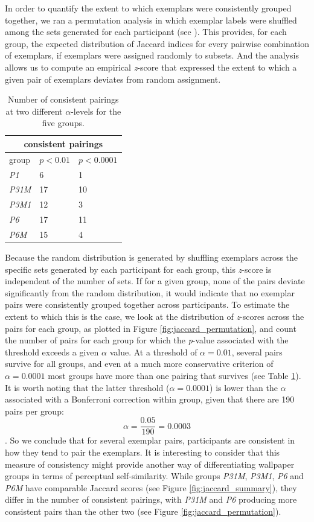 \documentclass[11pt, twoside]{article}
\begin{document}
In order to quantify the extent to which exemplars were consistently grouped together, we ran a permutation analysis in which exemplar labels were shuffled among the sets generated for each participant (see ). This provides, for each group, the expected distribution of Jaccard indices for every pairwise combination of exemplars, if exemplars were assigned randomly to subsets. And the analysis allows us to compute an empirical \textit{z}-score that expressed the extent to which a given pair of exemplars deviates from random assignment. 
\begin{table}
	\centering
	\begin{tabular}[t]{ |p{2cm}||p{2cm}|p{2cm}| }
		\hline
		\multicolumn{3}{|c|}{consistent pairings} \\
		\hline
		group & $p<0.01$ & $p<0.0001$ \\
		\hline
		\textit{P1}   & 6  & 1  \\
		\textit{P31M} & 17 & 10 \\
		\textit{P3M1} & 12 & 3  \\
		\textit{P6}   & 17 & 11 \\
		\textit{P6M}  & 15 & 4  \\
		\hline
	\end{tabular}
	\caption{Number of consistent pairings at two different $\alpha$-levels for the five groups.  }
	\label{table:pairings}
\end{table}
Because the random distribution is generated by shuffling exemplars across the specific sets generated by each participant for each group, this \textit{z}-score is independent of the number of sets. If for a given group, none of the pairs deviate significantly from the random distribution, it would indicate that no exemplar pairs were consistently grouped together across participants. To estimate the extent to which this is the case, we look at the distribution of \textit{z}-scores across the pairs for each group, as plotted in Figure \ref{fig:jaccard_permutation}, and count the number of pairs for each group for which the \textit{p}-value associated with the threshold exceeds a given $\alpha$ value. At a threshold of $\alpha = 0.01$, several pairs survive for all groups, and even at a much more conservative criterion of $\alpha = 0.0001$ most groups have more than one pairing that survives (see Table \ref{table:pairings}). It is worth noting that the latter threshold ($\alpha = 0.0001$) is lower than the $\alpha$ associated with a Bonferroni correction within group, given that there are 190 pairs per group: \[ \alpha = \frac{0.05}{190} = 0.0003 \].
So we conclude that for several exemplar pairs, participants are consistent in how they tend to pair the exemplars. It is interesting to consider that this measure of consistency might provide another way of differentiating wallpaper groups in terms of perceptual self-similarity. While groups \textit{P31M}, \textit{P3M1}, \textit{P6} and \textit{P6M} have comparable Jaccard scores (see Figure \ref{fig:jaccard_summary}), they differ in the number of consistent pairings, with \textit{P31M} and \textit{P6} producing more consistent pairs than the other two (see Figure \ref{fig:jaccard_permutation}). 
\end{document}
